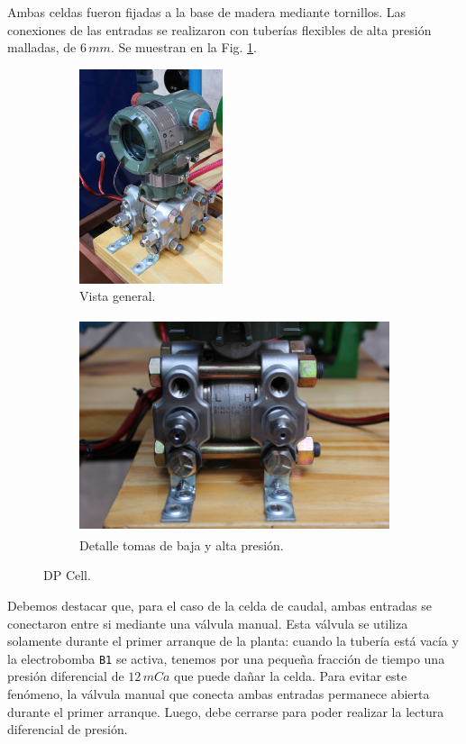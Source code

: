 Ambas celdas fueron fijadas a la base de madera mediante tornillos.
Las conexiones de las entradas se realizaron con tuberías flexibles de alta
presión malladas, de $6\,mm$. Se muestran en la Fig. \ref{fig:dpcelfig}.

\begin{figure}[t]
        \centering
        \begin{subfigure}[b]{0.31\textwidth}
        \centering
\includegraphics[height=6.3cm]
	{Cap2-DisenoEnsamblado/images/dpcell1.JPG}
	\caption{Vista general.}
        \end{subfigure}%
        \hfil
        \begin{subfigure}[b]{0.69\textwidth}
        \centering
\includegraphics[height=6.3cm]
	{Cap2-DisenoEnsamblado/images/dpcell2.JPG}
	\caption{Detalle tomas de baja y alta presión.}
        \end{subfigure}
        \caption{DP Cell.}
        \label{fig:dpcelfig}
\end{figure}

Debemos destacar que, para el caso de la celda de caudal, ambas
entradas se conectaron entre si mediante una válvula manual.
Esta válvula se utiliza solamente durante el primer arranque de la planta:
cuando la tubería está vacía y la electrobomba \verb|B1| se activa, tenemos por
una pequeña
fracción de tiempo una presión diferencial de $12\,mCa$ que puede dañar la
celda.
Para evitar este fenómeno, la válvula manual que conecta ambas entradas
permanece abierta durante el primer arranque.
Luego, debe cerrarse para poder realizar la lectura diferencial de presión.


